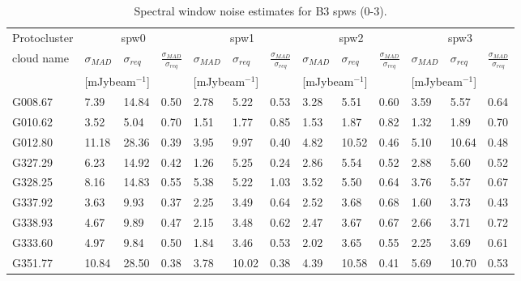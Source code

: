 \begin{table}[htbp!]
\centering
\caption{Spectral window noise estimates for B3 spws (0-3).}
\label{tab:spwsrms}
\begin{tabular}{@{\extracolsep{4pt}}lllllllllllll@{}}

\hline \noalign {\smallskip}
Protocluster  & \multicolumn{3}{c}{spw0}  & \multicolumn{3}{c}{spw1}  & \multicolumn{3}{c}{spw2}
    & \multicolumn{3}{c}{spw3}  \\ %
\cline{2-4}\cline{5-7}\cline{8-10}\cline{11-13}
cloud name\tnote{1}  & $\sigma_{MAD}$ & $\sigma_{req}$ & $\frac{\sigma_{MAD}}{\sigma_{req}}$  & $\sigma_{MAD}$ & $\sigma_{req}$ & $\frac{\sigma_{MAD}}{\sigma_{req}}$  & $\sigma_{MAD}$ & $\sigma_{req}$ & $\frac{\sigma_{MAD}}{\sigma_{req}}$  & $\sigma_{MAD}$ & $\sigma_{req}$ & $\frac{\sigma_{MAD}}{\sigma_{req}}$\\
& \multicolumn{2}{c}{[mJybeam$^{-1}$]}& & \multicolumn{2}{c}{[mJybeam$^{-1}$]}& &  \multicolumn{2}{c}{[mJybeam$^{-1}$]}& & \multicolumn{2}{c}{[mJybeam$^{-1}$]}\\
\hline \noalign {\smallskip}
G008.67  &  7.39 & 14.84 & 0.50 & 2.78 & 5.22 & 0.53 & 3.28 & 5.51 & 0.60 & 3.59 & 5.57 & 0.64 \\
G010.62  &  3.52 & 5.04 & 0.70 & 1.51 & 1.77 & 0.85 & 1.53 & 1.87 & 0.82 & 1.32 & 1.89 & 0.70 \\
G012.80  &  11.18 & 28.36 & 0.39 & 3.95 & 9.97 & 0.40 & 4.82 & 10.52 & 0.46 & 5.10 & 10.64 & 0.48 \\
G327.29  &  6.23 & 14.92 & 0.42 & 1.26 & 5.25 & 0.24 & 2.86 & 5.54 & 0.52 & 2.88 & 5.60 & 0.52 \\
G328.25  &  8.16 & 14.83 & 0.55 & 5.38 & 5.22 & 1.03 & 3.52 & 5.50 & 0.64 & 3.76 & 5.57 & 0.67 \\
G337.92  &  3.63 & 9.93 & 0.37 & 2.25 & 3.49 & 0.64 & 2.52 & 3.68 & 0.68 & 1.60 & 3.73 & 0.43 \\
G338.93  &  4.67 & 9.89 & 0.47 & 2.15 & 3.48 & 0.62 & 2.47 & 3.67 & 0.67 & 2.66 & 3.71 & 0.72 \\
G333.60  &  4.97 & 9.84 & 0.50 & 1.84 & 3.46 & 0.53 & 2.02 & 3.65 & 0.55 & 2.25 & 3.69 & 0.61 \\
G351.77  &  10.84 & 28.50 & 0.38 & 3.78 & 10.02 & 0.38 & 4.39 & 10.58 & 0.41 & 5.69 & 10.70 & 0.53 \\

\end{tabular}
\end{table}
